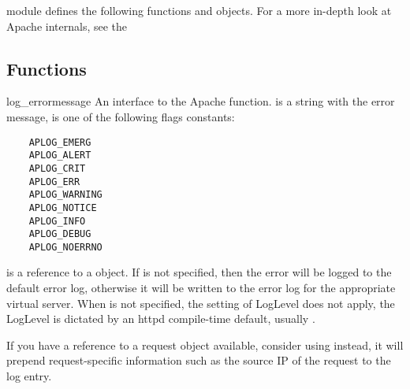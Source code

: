  module defines the following functions and
objects. For a more in-depth look at Apache internals, see the

\subsection{Functions\label{pyapi-apmeth}}

\begin{funcdesc}{log_error}{message}
  An interface to the Apache 
  function.  is a string with the error message,
   is one of the following flags constants:

  \begin{verbatim}
    APLOG_EMERG
    APLOG_ALERT
    APLOG_CRIT
    APLOG_ERR
    APLOG_WARNING
    APLOG_NOTICE
    APLOG_INFO
    APLOG_DEBUG
    APLOG_NOERRNO
  \end{verbatim}            
  
   is a reference to a  object. If
   is not specified, then the error will be logged to the
  default error log, otherwise it will be written to the error log for
  the appropriate virtual server. When  is not specified,
  the setting of LogLevel does not apply, the LogLevel is dictated by
  an httpd compile-time default, usually .

  If you have a reference to a request object available, consider using
   instead, it will prepend request-specific
  information such as the source IP of the request to the log entry.
\end{funcdesc}

